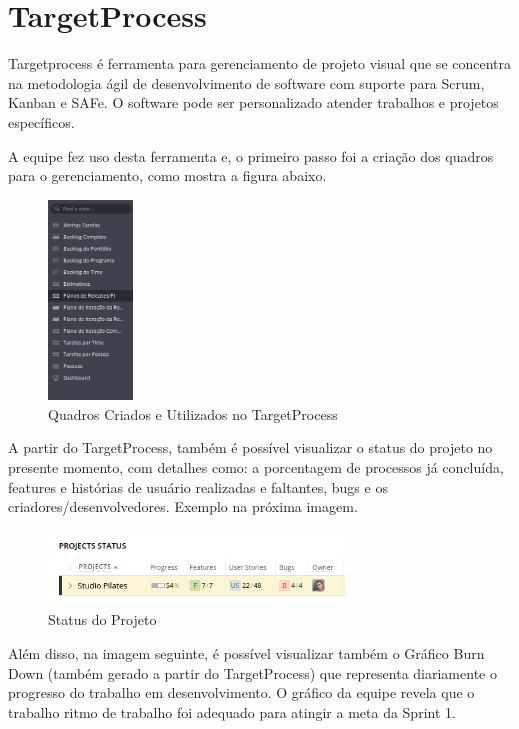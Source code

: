 \section[TargetProcess]{TargetProcess}
Targetprocess é ferramenta para gerenciamento de projeto visual que se concentra na metodologia ágil de desenvolvimento de software com suporte para Scrum, Kanban e SAFe. O software pode ser personalizado atender trabalhos e projetos específicos. 

A equipe fez uso desta ferramenta e, o primeiro passo foi a criação dos quadros para o gerenciamento, como mostra a figura abaixo.

\begin{figure}[!htb]
    \centering
    \includegraphics[width=0.2\textwidth]{figuras/quadros.png}
    \caption{Quadros Criados e Utilizados no TargetProcess}
    \label{fig:quadros}
\end{figure}

A partir do TargetProcess, também é possível visualizar o status do projeto no presente momento, com detalhes como: a porcentagem de processos já concluída, features e histórias de usuário realizadas e faltantes, bugs e os criadores/desenvolvedores. Exemplo na próxima imagem.

\begin{figure}[!htb]
    \centering
    \includegraphics[width=0.7\textwidth]{figuras/status_projeto.png}
    \caption{Status do Projeto}
    \label{fig:status_projeto}
\end{figure}

Além disso, na imagem seguinte, é possível visualizar também o Gráfico Burn Down (também gerado a partir do TargetProcess) que representa diariamente o progresso do trabalho em desenvolvimento. O gráfico da equipe revela que o trabalho ritmo de trabalho foi adequado para atingir a meta da Sprint 1.

